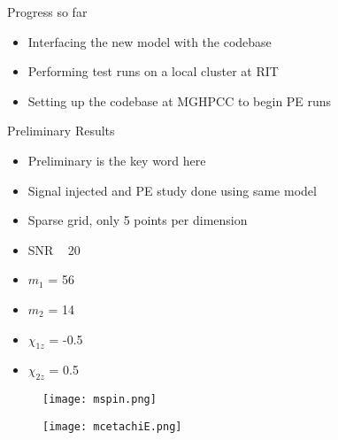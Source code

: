 \documentclass[uncompress,aspectratio=43]{beamer}  %
\begin{document}
\begin{frame}{Progress so far}
  \begin{itemize}
  \item Interfacing the new model with the codebase
  \item Performing test runs on a local cluster at RIT
  \item Setting up the codebase at MGHPCC to begin PE runs
  \end{itemize}
  \end{frame}

  \begin{frame}{Preliminary Results}
    
    \begin{itemize}
    \item Preliminary is the key word here
      \item Signal injected and PE study done using same model
      \item Sparse grid, only 5 points per dimension
        \item SNR ~ 20

      \item $m_1$ = 56
    \item $m_2$ = 14
    \item $\chi_{1z}$ = -0.5
    \item $\chi_{2z}$ = 0.5
    \end{itemize}
    
  \end{frame}

  \begin{frame}
    \begin{figure}
      \begin{center}
        \texttt{[image: mspin.png]}
        \caption{}
      \end{center}
    \end{figure}
    \end{frame}

  \begin{frame}
    \begin{figure}
      \begin{center}
        \texttt{[image: mcetachiE.png]}
        \caption{}
      \end{center}
    \end{figure}
    \end{frame}
\end{document}
